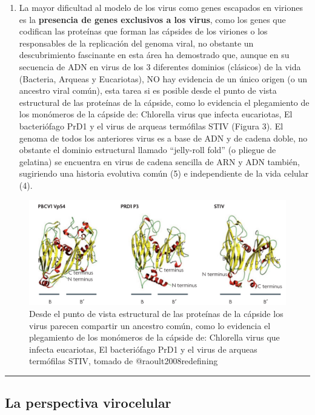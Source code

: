 \documentclass[
  12pt, krantz2,
  spanish,
]{krantz}
\providecommand{\tightlist}{%
  \setlength{\itemsep}{0pt}\setlength{\parskip}{0pt}}
\begin{document}
\begin{enumerate}
\def\labelenumi{(\Roman{enumi})}
\setcounter{enumi}{2}
\tightlist
\item
  La mayor dificultad al modelo de los virus como genes escapados en viriones es la \textbf{presencia de genes exclusivos a los virus}, como los genes que codifican las proteínas que forman las cápsides de los viriones o los responsables de la replicación del genoma viral, no obstante un descubrimiento fascinante en esta área ha demostrado que, aunque en su secuencia de ADN en virus de los 3 diferentes dominios (clásicos) de la vida (Bacteria, Arqueas y Eucariotas), NO hay evidencia de un único origen (o un ancestro viral común), esta tarea si es posible desde el punto de vista estructural de las proteínas de la cápside, como lo evidencia el plegamiento de los monómeros de la cápside de: Chlorella virus que infecta eucariotas, El bacteriófago PrD1 y el virus de arqueas termófilas STIV (Figura 3). El genoma de todos los anteriores virus es a base de ADN y de cadena doble, no obstante el dominio estructural llamado ``jelly-roll fold'' (o pliegue de gelatina) se encuentra en virus de cadena sencilla de ARN y ADN también, sugiriendo una historia evolutiva común (5) e independiente de la vida celular (4).
\end{enumerate}

\begin{figure}
\includegraphics[width=0.8\linewidth]{figures/jelly-roll} \caption{Desde el punto de vista estructural de las proteínas de la cápside los virus parecen compartir un ancestro común, como lo evidencia el plegamiento de los monómeros de la cápside de: Chlorella virus que infecta eucariotas, El bacteriófago PrD1 y el virus de arqueas termófilas STIV, tomado de @raoult2008redefining}\label{fig:jellyroll}
\end{figure}

\begin{center}\rule{0.5\linewidth}{0.5pt}\end{center}

\hypertarget{la-perspectiva-virocelular}{%
\subsection{La perspectiva virocelular}\label{la-perspectiva-virocelular}}
\end{document}
